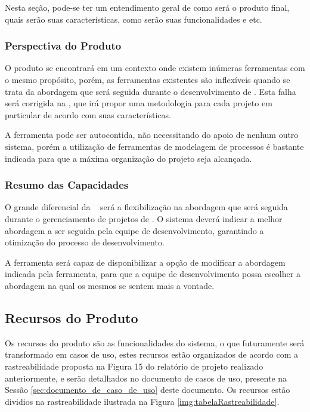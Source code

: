 Nesta seção, pode-se ter um entendimento geral de como será o produto final, quais serão suas características, como serão suas funcionalidades e etc.

\subsubsection{Perspectiva do Produto}
	
O produto se encontrará em um contexto onde existem inúmeras ferramentas com o mesmo propósito, porém, as ferramentas existentes são inflexíveis quando se trata da abordagem que será seguida durante o desenvolvimento de \sw. Esta falha será corrigida na \nomeferramenta, que irá propor uma metodologia para cada projeto em particular de acordo com suas características.

A ferramenta pode ser autocontida, não necessitando do apoio de nenhum outro sistema, porém a utilização de ferramentas de modelagem de processos é bastante indicada para que a máxima organização do projeto seja alcançada.

\subsubsection{Resumo das Capacidades}
	
O grande diferencial da \nomeferramenta~ será a flexibilização na abordagem que será seguida durante o gerenciamento de projetos de \sw. O sistema deverá indicar a melhor abordagem a ser seguida pela equipe de desenvolvimento, garantindo a otimização do processo de desenvolvimento.

A ferramenta será capaz de disponibilizar a opção de modificar a abordagem indicada pela ferramenta, para que a equipe de desenvolvimento possa escolher a abordagem na qual os mesmos se sentem mais a vontade.

\subsection{Recursos do Produto}
\label{subsub:recursos_produto}

Os recursos do produto são as funcionalidades do sistema, o que futuramente será transformado em casos de uso, estes recursos estão organizados de acordo com a rastreabilidade proposta na Figura 15 do relatório de projeto realizado anteriormente, e serão detalhados no documento de casos de uso, presente na Sessão \ref{sec:documento_de_caso_de_uso} deste documento. Os recursos estão dividios na rastreabilidade ilustrada na Figura \ref{img:tabelaRastreabilidade}.

